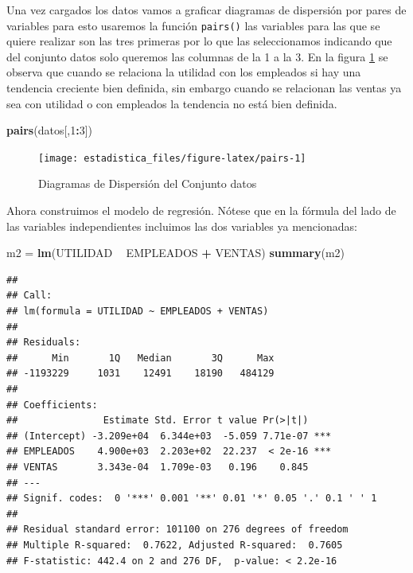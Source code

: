\documentclass[]{book}
\newenvironment{Shaded}{\begin{snugshade}}{\end{snugshade}}
\newcommand{\DecValTok}[1]{\textcolor[rgb]{0.00,0.00,0.81}{#1}}
\newcommand{\KeywordTok}[1]{\textcolor[rgb]{0.13,0.29,0.53}{\textbf{#1}}}
\newcommand{\NormalTok}[1]{#1}
\newcommand{\OperatorTok}[1]{\textcolor[rgb]{0.81,0.36,0.00}{\textbf{#1}}}
\newcommand{\StringTok}[1]{\textcolor[rgb]{0.31,0.60,0.02}{#1}}
\begin{document}
Una vez cargados los datos vamos a graficar diagramas de dispersión por pares de variables para esto usaremos la función \texttt{pairs()} las variables para las que se quiere realizar son las tres primeras por lo que las seleccionamos indicando que del conjunto datos solo queremos las columnas de la 1 a la 3. En la figura \ref{fig:pairs} se observa que cuando se relaciona la utilidad con los empleados si hay una tendencia creciente bien definida, sin embargo cuando se relacionan las ventas ya sea con utilidad o con empleados la tendencia no está bien definida.

\begin{Shaded}
\begin{Highlighting}[]
\KeywordTok{pairs}\NormalTok{(datos[,}\DecValTok{1}\OperatorTok{:}\DecValTok{3}\NormalTok{])}
\end{Highlighting}
\end{Shaded}

\begin{figure}[!h]

{\centering \texttt{[image: estadistica\_files/figure-latex/pairs-1]} 

}

\caption{Diagramas de Dispersión del Conjunto datos}\label{fig:pairs}
\end{figure}

Ahora construimos el modelo de regresión. Nótese que en la fórmula del lado de las variables independientes incluimos las dos variables ya mencionadas:

\begin{Shaded}
\begin{Highlighting}[]
\NormalTok{m2 =}\StringTok{ }\KeywordTok{lm}\NormalTok{(UTILIDAD }\OperatorTok{~}\StringTok{ }\NormalTok{EMPLEADOS }\OperatorTok{+}\StringTok{ }\NormalTok{VENTAS)}
\KeywordTok{summary}\NormalTok{(m2)}
\end{Highlighting}
\end{Shaded}

\begin{verbatim}
## 
## Call:
## lm(formula = UTILIDAD ~ EMPLEADOS + VENTAS)
## 
## Residuals:
##      Min       1Q   Median       3Q      Max 
## -1193229     1031    12491    18190   484129 
## 
## Coefficients:
##               Estimate Std. Error t value Pr(>|t|)    
## (Intercept) -3.209e+04  6.344e+03  -5.059 7.71e-07 ***
## EMPLEADOS    4.900e+03  2.203e+02  22.237  < 2e-16 ***
## VENTAS       3.343e-04  1.709e-03   0.196    0.845    
## ---
## Signif. codes:  0 '***' 0.001 '**' 0.01 '*' 0.05 '.' 0.1 ' ' 1
## 
## Residual standard error: 101100 on 276 degrees of freedom
## Multiple R-squared:  0.7622, Adjusted R-squared:  0.7605 
## F-statistic: 442.4 on 2 and 276 DF,  p-value: < 2.2e-16
\end{verbatim}
\end{document}
